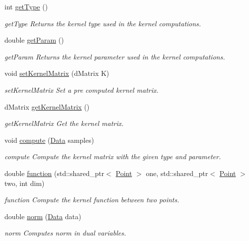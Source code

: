 \begin{DoxyCompactItemize}
int \hyperlink{class_kernel_a5a2cb0fce0eda6c67a2325f6c8958da8}{get\+Type} ()
\begin{DoxyCompactList}\small\item\em get\+Type Returns the kernel type used in the kernel computations. \end{DoxyCompactList}\item 
double \hyperlink{class_kernel_a838e2cc5018fa702e59c52a3bf8ef813}{get\+Param} ()
\begin{DoxyCompactList}\small\item\em get\+Param Returns the kernel parameter used in the kernel computations. \end{DoxyCompactList}\item 
void \hyperlink{class_kernel_a3801cee0d86f25f1500d202f43a84b65}{set\+Kernel\+Matrix} (d\+Matrix K)
\begin{DoxyCompactList}\small\item\em set\+Kernel\+Matrix Set a pre computed kernel matrix. \end{DoxyCompactList}\item 
d\+Matrix \hyperlink{class_kernel_a5e398c63fee5f0e30b6dfb735c75e41a}{get\+Kernel\+Matrix} ()
\begin{DoxyCompactList}\small\item\em get\+Kernel\+Matrix Get the kernel matrix. \end{DoxyCompactList}\item 
void \hyperlink{class_kernel_a5dfd3a6b535745eadd9e17dc086d87c6}{compute} (\hyperlink{class_data}{Data} samples)
\begin{DoxyCompactList}\small\item\em compute Compute the kernel matrix with the given type and parameter. \end{DoxyCompactList}\item 
double \hyperlink{class_kernel_aa07703cd76124769325d942582b16b5f}{function} (std\+::shared\+\_\+ptr$<$ \hyperlink{class_point}{Point} $>$ one, std\+::shared\+\_\+ptr$<$ \hyperlink{class_point}{Point} $>$ two, int dim)
\begin{DoxyCompactList}\small\item\em function Compute the kernel function between two points. \end{DoxyCompactList}\item 
double \hyperlink{class_kernel_a1f548d2e5477ae0ee3dd3bc7f23e6920}{norm} (\hyperlink{class_data}{Data} data)
\begin{DoxyCompactList}\small\item\em norm Computes norm in dual variables. \end{DoxyCompactList}\end{DoxyCompactItemize}


